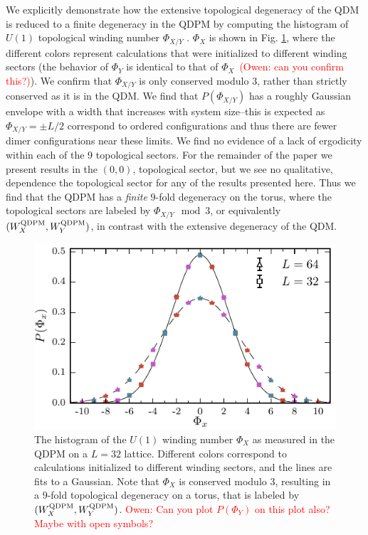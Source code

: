\documentclass[twocolumn,prb,aps,floatfix,superscriptaddress]{revtex4-1}
\newcommand{\figref}[1]{Fig. \ref{#1}}
\newcommand{\note}[1]{\textcolor{red}{#1}}
\begin{document}
We explicitly demonstrate how the extensive topological degeneracy of the QDM is reduced to a finite degeneracy in the QDPM by computing the histogram of $U(1)$ topological winding number $\Phi_{X/Y}$ . $\Phi_X$ is shown in \figref{fig:u1_wind_qdpm}, where the different colors represent calculations that were initialized to different winding sectors (the behavior of $\Phi_Y$ is identical to that of $\Phi_X$~\note{(Owen: can you confirm this?)}). We confirm that $\Phi_{X/Y}$ is only conserved modulo $3$, rather than strictly conserved as it is in the QDM. We find that $P(\Phi_{X/Y})$ has a roughly Gaussian envelope with a width that increases with system size--this is expected as $\Phi_{X/Y} = \pm L/2$ correspond to ordered configurations and thus there are fewer dimer configurations near these limits. We find no evidence of a lack of ergodicity within each of the 9 topological sectors. For the remainder of the paper we present results in the $(0,0)$, topological sector, but we see no qualitative, dependence the topological sector for any of the results presented here. Thus we find that the QDPM has a \emph{finite} $9$-fold degeneracy on the torus, where the topological sectors are labeled by $\Phi_{X/Y} \mod 3$, or equivalently $(W_X^{\rm{QDPM}},W_Y^{\rm{QDPM}})$, in contrast with the extensive degeneracy of the QDM.
\begin{figure}[]
    \centering
    \includegraphics[width=1.0\linewidth]{u1_wind_qdpm.pdf}
    \caption{The histogram of the $U(1)$ winding number $\Phi_X$ as measured in the QDPM on a
    $L=32$ lattice. Different colors correspond to calculations initialized to different winding sectors, and the lines are fits to a Gaussian. Note that $\Phi_X$ is conserved modulo $3$, resulting in a $9$-fold topological degeneracy on a torus, that is labeled by $(W_X^{\rm{QDPM}},W_Y^{\rm{QDPM}})$. \note{Owen: Can you plot $P\left(\Phi_Y\right)$ on this plot also? Maybe with open symbols?}}
    \label{fig:u1_wind_qdpm}
\end{figure}
\end{document}
